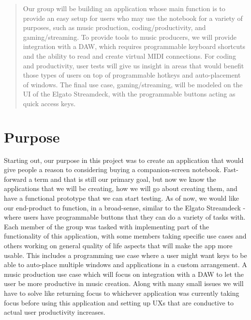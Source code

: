 \documentclass[fullpage, 10pt, onecolumn, draftclsnofoot]{IEEEtran}
\begin{document}
\begin{titlepage}
\begin{singlespace}
\begin{abstract}
Our group will be building an application whose main function is to provide an easy setup for users who may use the notebook for a variety of purposes, such as music production, coding/productivity, and gaming/streaming. To provide tools to music producers, we will provide integration with a DAW, which requires programmable keyboard shortcuts and the ability to read and create virtual MIDI connections. For coding and productivity, user tests will give us insight in areas that would benefit those types of users on top of programmable hotkeys and auto-placement of windows.  The final use case, gaming/streaming, will be modeled on the UI of the Elgato Streamdeck, with the programmable buttons acting as quick access keys.
        \end{abstract}     
    \end{singlespace}
\end{titlepage}
\newpage

\singlespacing


\tableofcontents
\newpage
 
\section{Purpose}
Starting out, our purpose in this project was to create an application that would give people a reason to considering buying
a companion-screen notebook. Fast-forward a term and that is still our primary goal, but now we know the applications
that we will be creating, how we will go about creating them, and have a functional prototype that we can start testing. As of now, we would like our end-product to function,
in a broad-sense, similar to the Elgato Streamdeck - where users have programmable buttons that they can do a variety of
tasks with. \\ 
\newline
\indent Each member of the group was tasked with implementing part of the functionality of this application, with
some members taking specific use cases and others working on general quality of life aspects that will make the app more
usable. This includes a programming use case where a user might want keys to be able to auto-place multiple windows
and applications in a custom arrangement. A music production use case which will focus on integration with a DAW to let
the user be more productive in music creation. Along with many small issues we will have to solve like returning focus to
whichever application was currently taking focus before using this application and setting up UXs that are conductive to
actual user productivity increases.
\end{document}
